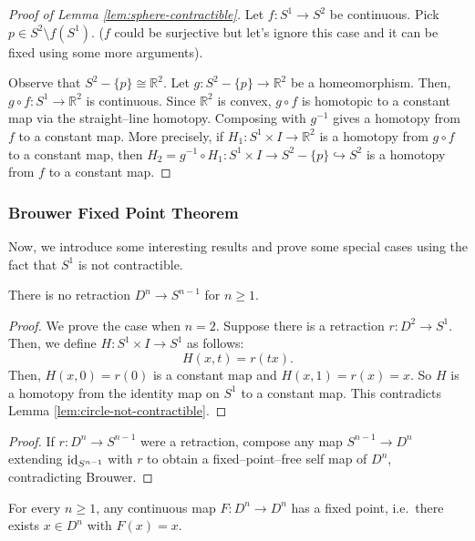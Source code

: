 \begin{proof}[Proof of Lemma \ref{lem:sphere-contractible}]
  Let $f:S^1\to S^2$ be continuous. Pick $p\in S^2\setminus f(S^1)$. ($f$ could be surjective but let's ignore this case and it can be fixed using some more arguments).


  Observe that $S^2-\{p\} \cong \mathbb{R}^2$. Let $g:S^2-\{p\} \to \mathbb{R}^2$ be a homeomorphism. Then, $g\circ f:S^1\to \mathbb{R}^2$ is continuous. Since $\mathbb{R}^2$ is convex, $g\circ f$ is homotopic to a constant map via the straight--line homotopy. Composing with $g^{-1}$ gives a homotopy from $f$ to a constant map. More precisely, if $H_1:S^1\times I\to \mathbb{R}^2$ is a homotopy from $g\circ f$ to a constant map, then $H_2=g^{-1}\circ H_1:S^1\times I\to S^2-\{p\}\hookrightarrow S^2$ is a homotopy from $f$ to a constant map.

  
\end{proof}

\newpage

\subsubsection*{Brouwer Fixed Point Theorem}

Now, we introduce some interesting results and prove some special cases using the fact that $S^1$ is not contractible.

\begin{theorem}[No retraction]
There is no retraction $D^n\to S^{n-1}$ for $n\ge 1$.
\end{theorem}
\begin{proof}
  We prove the case when $n=2$. Suppose there is a retraction $r:D^2\to S^1$. Then, we define $H:S^1\times I\to S^1$ as follows:
  \[H(x,t)=r(tx).
  \]
  Then, $H(x,0)=r(0)$ is a constant map and $H(x,1)=r(x)=x$. So $H$ is a homotopy from the identity map on $S^1$ to a constant map. This contradicts Lemma \ref{lem:circle-not-contractible}.
\end{proof}

\begin{proof}
If $r\colon D^n\to S^{n-1}$ were a retraction, compose any map $S^{n-1}\to D^n$ extending $\text{id}_{S^{n-1}}$ with $r$ to obtain a fixed–point–free self map of $D^n$, contradicting Brouwer.
\end{proof}

\begin{corollary}
For every $n\ge 1$, any continuous map $F\colon D^n\to D^n$ has a fixed point, i.e.\ there exists $x\in D^n$ with $F(x)=x$.
\end{corollary}

